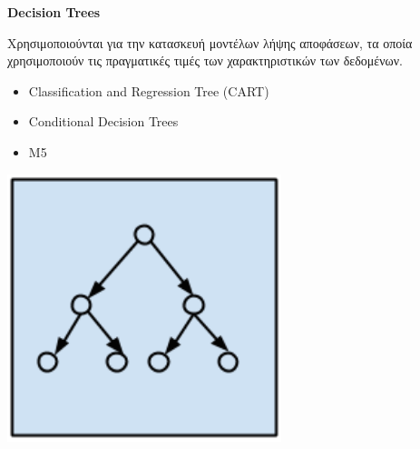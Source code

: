 \begin{minipage}{0.5\textwidth}

  \textbf{\large Decision Trees}

  Χρησιμοποιούνται για την κατασκευή μοντέλων
  λήψης αποφάσεων, τα οποία χρησιμοποιούν τις πραγματικές τιμές των
  χαρακτηριστικών των δεδομένων.
  \begin{itemize}
    \setlength\itemsep{0em}
    \item{Classification and Regression Tree (CART)}
    \item{Conditional Decision Trees}
    \item{M5}
  \end{itemize}
\end{minipage}
\begin{minipage}{0.5\textwidth}
  \begin{center}
    \includegraphics[width=0.6\textwidth]{./images/chapter3/decision_tree_algorithms.png}
  \end{center}
\end{minipage}

